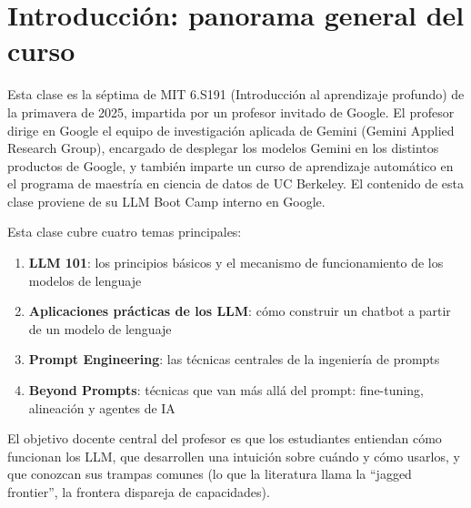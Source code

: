 \section{Introducción: panorama general del curso}

Esta clase es la séptima de MIT 6.S191 (Introducción al aprendizaje profundo) de la primavera de 2025, impartida por un profesor invitado de Google. El profesor dirige en Google el equipo de investigación aplicada de Gemini (Gemini Applied Research Group), encargado de desplegar los modelos Gemini en los distintos productos de Google, y también imparte un curso de aprendizaje automático en el programa de maestría en ciencia de datos de UC Berkeley. El contenido de esta clase proviene de su LLM Boot Camp interno en Google.

Esta clase cubre cuatro temas principales:
\begin{enumerate}
    \item \textbf{LLM 101}: los principios básicos y el mecanismo de funcionamiento de los modelos de lenguaje
    \item \textbf{Aplicaciones prácticas de los LLM}: cómo construir un chatbot a partir de un modelo de lenguaje
    \item \textbf{Prompt Engineering}: las técnicas centrales de la ingeniería de prompts
    \item \textbf{Beyond Prompts}: técnicas que van más allá del prompt: fine-tuning, alineación y agentes de IA
\end{enumerate}

El objetivo docente central del profesor es que los estudiantes entiendan cómo funcionan los LLM, que desarrollen una intuición sobre cuándo y cómo usarlos, y que conozcan sus trampas comunes (lo que la literatura llama la ``jagged frontier'', la frontera dispareja de capacidades).

